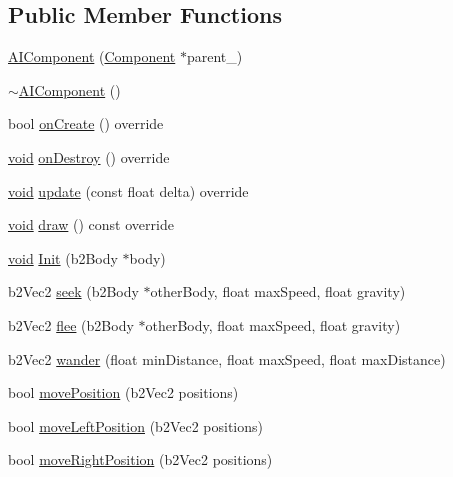 \subsection*{Public Member Functions}
\begin{DoxyCompactItemize}
\item 
\hyperlink{classAIComponent_a78108337893807f59557596e2825cbb3}{A\+I\+Component} (\hyperlink{classComponent}{Component} $\ast$parent\+\_\+)
\item 
\hyperlink{classAIComponent_a0ffc6db0d1cb5720b8aaef8ec28f4efe}{$\sim$\+A\+I\+Component} ()
\item 
bool \hyperlink{classAIComponent_a1f7e2f748183cbcba9e3f351025b862c}{on\+Create} () override
\item 
\hyperlink{imgui__impl__opengl3__loader_8h_ac668e7cffd9e2e9cfee428b9b2f34fa7}{void} \hyperlink{classAIComponent_a82e8e79810024e09695545ebf59452f2}{on\+Destroy} () override
\item 
\hyperlink{imgui__impl__opengl3__loader_8h_ac668e7cffd9e2e9cfee428b9b2f34fa7}{void} \hyperlink{classAIComponent_a456939f85de6d6cfc3e4e48ffc9f568c}{update} (const float delta) override
\item 
\hyperlink{imgui__impl__opengl3__loader_8h_ac668e7cffd9e2e9cfee428b9b2f34fa7}{void} \hyperlink{classAIComponent_ab4d6c5c6043cfa275e4edce5b575a8a9}{draw} () const override
\item 
\hyperlink{imgui__impl__opengl3__loader_8h_ac668e7cffd9e2e9cfee428b9b2f34fa7}{void} \hyperlink{classAIComponent_a09ef4a12ea342b7e9cbb0f0e1aeceefe}{Init} (b2\+Body $\ast$body)
\item 
b2\+Vec2 \hyperlink{classAIComponent_a356b7fa667e4aed3fdf790a58916c3b9}{seek} (b2\+Body $\ast$other\+Body, float max\+Speed, float gravity)
\item 
b2\+Vec2 \hyperlink{classAIComponent_adc2c03c2bd20fd66ed26580e2b8d2784}{flee} (b2\+Body $\ast$other\+Body, float max\+Speed, float gravity)
\item 
b2\+Vec2 \hyperlink{classAIComponent_aee1af922a048c44f48cb204d8e153fb5}{wander} (float min\+Distance, float max\+Speed, float max\+Distance)
\item 
bool \hyperlink{classAIComponent_a24853885627e632ae760ae372bb57714}{move\+Position} (b2\+Vec2 positions)
\item 
bool \hyperlink{classAIComponent_aa584e4cfba8281933bfff799c9caf06d}{move\+Left\+Position} (b2\+Vec2 positions)
\item 
bool \hyperlink{classAIComponent_ac7ae5bfd9cf4e5163a4289c096c78f7c}{move\+Right\+Position} (b2\+Vec2 positions)

\end{DoxyCompactItemize}
